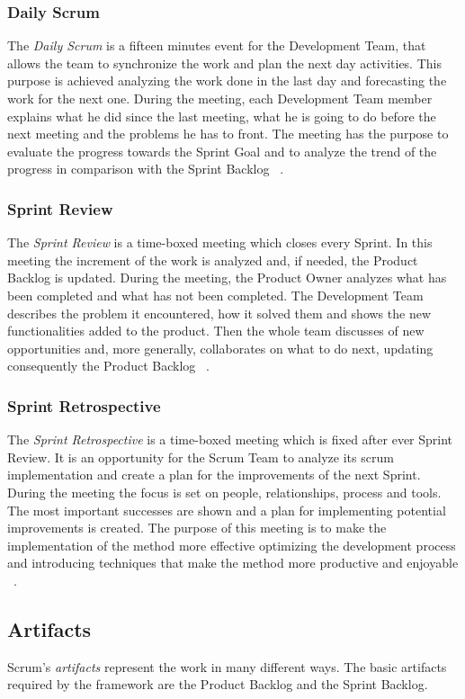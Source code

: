 			\subsubsection{Daily Scrum}
			The \emph{Daily Scrum} is a fifteen minutes event for the Development Team, that allows the team to synchronize the work and plan the next day activities. This purpose is achieved analyzing the work done in the last day and forecasting the work for the next one. 
			During the meeting, each Development Team member explains what he did since the last meeting, what he is going to do before the next meeting and the problems he has to front.
			The meeting has the purpose to evaluate the progress towards the Sprint Goal and to analyze the trend of the progress in comparison with the Sprint Backlog ~\cite{scrumEnglishGuide}. 

			\subsubsection{Sprint Review}
			The \emph{Sprint Review} is a time-boxed meeting which closes every Sprint. In this meeting the increment of the work is analyzed and, if needed, the Product Backlog is updated. 
			During the meeting, the Product Owner analyzes what has been completed and what has not been completed. The Development Team describes the problem it encountered, how it solved them and shows the new functionalities added to the product. Then the whole team discusses of new opportunities and, more generally, collaborates on what to do next, updating consequently the Product Backlog ~\cite{scrumEnglishGuide}.			

			\subsubsection{Sprint Retrospective}
			The \emph{Sprint Retrospective} is a time-boxed meeting which is fixed after ever Sprint Review. It is an opportunity for the Scrum Team to analyze its scrum implementation and create a plan for the improvements of the next Sprint. 
			During the meeting the focus is set on people, relationships, process and tools. The most important successes are shown and a plan for implementing potential improvements is created. 
			The purpose of this meeting is to make the implementation of the method more effective optimizing the development process and introducing techniques that make the method more productive and enjoyable ~\cite{scrumEnglishGuide}. 

		
		\subsection{Artifacts}
			Scrum's \emph{artifacts} represent the work in many different ways. The basic artifacts required by the framework are the Product Backlog and the Sprint Backlog.

